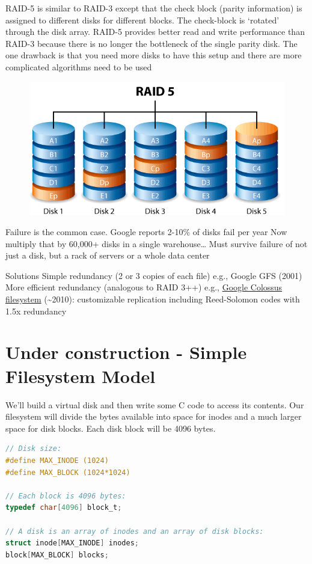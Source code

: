 RAID-5 is similar to RAID-3 except that the check block (parity information) is assigned to different disks for different blocks. The check-block is `rotated' through the disk array. RAID-5 provides better read and write performance than RAID-3 because there is no longer the bottleneck of the single parity disk. The one drawback is that you need more disks to have this setup and there are more complicated algorithms need to be used

\begin{figure}[htbp]
\centering
\includegraphics[width=.8\textwidth]{filesystems/images/raid_5.png}
\caption{}
\end{figure}

Failure is the common case. Google reports 2-10\% of disks fail per year Now multiply that by 60,000+ disks in a single warehouse\ldots{} Must survive failure of not just a disk, but a rack of servers or a whole data center

Solutions Simple redundancy (2 or 3 copies of each file) e.g., Google GFS (2001) More efficient redundancy (analogous to RAID 3++) e.g., \href{http://goo.gl/LwFIy}{Google Colossus filesystem} (\textasciitilde{}2010): customizable replication including Reed-Solomon codes with 1.5x redundancy

\section{Under construction - Simple Filesystem Model}

We'll build a virtual disk and then write some C code to access its contents. Our filesystem will divide the bytes available into space for inodes and a much larger space for disk blocks. Each disk block will be 4096 bytes.

\begin{lstlisting}[language=C]
// Disk size:
#define MAX_INODE (1024)
#define MAX_BLOCK (1024*1024)

// Each block is 4096 bytes:
typedef char[4096] block_t;

// A disk is an array of inodes and an array of disk blocks:
struct inode[MAX_INODE] inodes;
block[MAX_BLOCK] blocks;
\end{lstlisting}

